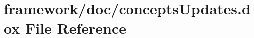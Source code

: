 \hypertarget{concepts_updates_8dox}{}\section{framework/doc/concepts\+Updates.dox File Reference}
\label{concepts_updates_8dox}
